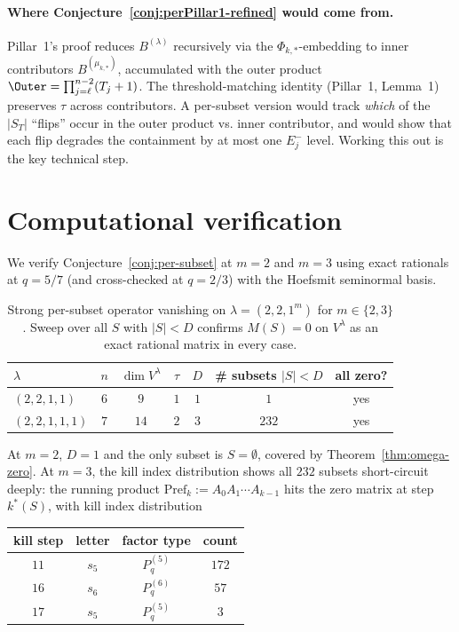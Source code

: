 \documentclass[11pt]{article}
\theoremstyle{definition}
\newcommand{\Vlam}{V^\lambda}
\newcommand{\Eminus}[1]{E^-_{#1}}
\begin{document}
\paragraph{Where Conjecture~\ref{conj:perPillar1-refined} would come from.}
Pillar~1's proof reduces $B^{(\lambda)}$ recursively via the
$\Phi_{k,*}$-embedding to inner contributors $B^{(\mu_{k,*})}$, accumulated
with the outer product $\Outer = \prod_{j=\ell}^{n-2}(T_j+1)$. The
threshold-matching identity (Pillar~1, Lemma~1) preserves $\tau$ across
contributors. A per-subset version would track \emph{which} of the $|S_T|$
``flips'' occur in the outer product vs. inner contributor, and would show
that each flip degrades the containment by at most one $\Eminus j$ level.
Working this out is the key technical step.

\section{Computational verification}\label{sec:verify}

We verify Conjecture~\ref{conj:per-subset} at $m = 2$ and $m = 3$ using exact
rationals at $q = 5/7$ (and cross-checked at $q = 2/3$) with the Hoefsmit
seminormal basis.

\begin{table}[h]
\centering\renewcommand{\arraystretch}{1.2}
\caption{Strong per-subset operator vanishing on $\lambda = (2,2,1^m)$ for
$m \in \{2, 3\}$. Sweep over all $S$ with $|S| < D$ confirms $M(S) = 0$ on
$\Vlam$ as an exact rational matrix in every case.}
\begin{tabular}{lcccccc}
\toprule
$\lambda$ & $n$ & $\dim\Vlam$ & $\tau$ & $D$ & \# subsets $|S|<D$ & all zero? \\
\midrule
$(2,2,1,1)$    & $6$ & $9$  & $1$ & $1$ & $1$   & yes \\
$(2,2,1,1,1)$  & $7$ & $14$ & $2$ & $3$ & $232$ & yes \\
\bottomrule
\end{tabular}
\end{table}

\noindent
At $m=2$, $D = 1$ and the only subset is $S = \emptyset$, covered by
Theorem~\ref{thm:omega-zero}. At $m=3$, the kill index distribution shows
all $232$ subsets short-circuit deeply: the running product $\mathrm{Pref}_k :=
A_0 A_1 \cdots A_{k-1}$ hits the zero matrix at step $k^*(S)$, with kill index
distribution

\begin{center}
\begin{tabular}{cccc}
\toprule
kill step & letter & factor type & count \\
\midrule
$11$ & $s_5$ & $P_q^{(5)}$ & $172$ \\
$16$ & $s_6$ & $P_q^{(6)}$ & $57$  \\
$17$ & $s_5$ & $P_q^{(5)}$ & $3$   \\
\bottomrule
\end{tabular}
\end{center}
\end{document}
